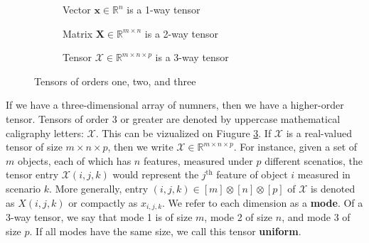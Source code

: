     \begin{figure}[ht]
        \def\distance{0.2}
        \def\one{0.3}
        \def\n{2}
        \def\m{2.5}
        \def\p{1.5}
        \def\rot{90}

        \centering
        
        \begin{subfigure}[b]{0.26\textwidth}
            \centering
            
            \caption[a Vector]{Vector $\mathbf{x}\in \mathbb{R}^n$ is a 1-way tensor}
            \label{fig:vector}
        \end{subfigure}
        \hfill
        \begin{subfigure}[b]{0.3\textwidth}
            \centering
            
            \caption[a Matrix]{Matrix $\mathbf{X} \in \mathbb{R}^{m\times n}$ is a 2-way tensor}
            \label{fig:matrix}
        \end{subfigure}
        \hfill
        \begin{subfigure}[b]{0.31\textwidth}
            \centering
            
            \caption[a 3D Tensor]{Tensor $\mathcal{X}\in \mathbb{R}^{m\times n \times p}$ is a 3-way tensor}
            \label{fig:tensor3}
        \end{subfigure}

        \caption{Tensors of orders one, two, and three}
        \label{fig:Tensors123}
    \end{figure}

    If we have a three-dimensional array of numners, then we have a higher-order
    tensor. Tensors of order 3 or greater are denoted by uppercase mathematical
    caligraphy letters: $\mathcal{X}$. This can be vizualized on Fiugure
    \ref{fig:tensor3}. If $\mathcal{X}$ is a real-valued tensor of size $m\times
    n \times p$, then we write $\mathcal{X}\in \mathbb{R}^{m\times n\times p}$.
    For instance, given a set of $m$ objects, each of which has $n$ features,
    measured under $p$ different scenatios, the tensor entry $\mathcal{X}(i, j,
    k)$ would represent the $j^\text{th}$ feature of object $i$ measured in
    scenario $k$. More generally, entry $(i, j, k) \in [m]\otimes [n]\otimes
    [p]$ of $\mathcal{X}$ is denoted as $X(i, j, k)$ or compactly as
    $x_{i, j, k}$. We refer to each dimension as a \textbf{mode}. Of a
    3-way tensor, we say that mode 1 is of size $m$, mode 2 of size $n$, and
    mode 3 of size $p$. If all modes have the same size, we call this tensor
    \textbf{uniform}.

